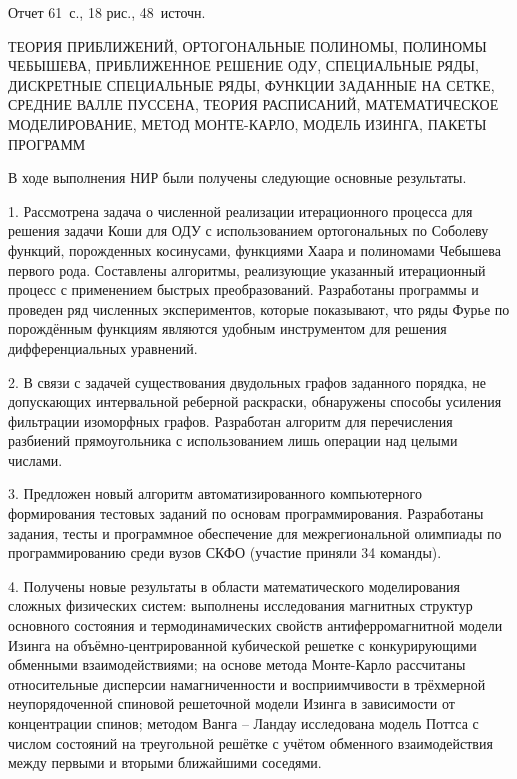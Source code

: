 \Referat %

Отчет 61~с., 18 рис., 48~источн.

 \bigskip
   
   ТЕОРИЯ ПРИБЛИЖЕНИЙ, ОРТОГОНАЛЬНЫЕ ПОЛИНОМЫ, ПОЛИНОМЫ ЧЕБЫШЕВА, %
   ПРИБЛИЖЕННОЕ РЕШЕНИЕ ОДУ, СПЕЦИАЛЬНЫЕ РЯДЫ, ДИСКРЕТНЫЕ СПЕЦИАЛЬНЫЕ РЯДЫ, 
   ФУНКЦИИ ЗАДАННЫЕ НА СЕТКЕ, СРЕДНИЕ ВАЛЛЕ ПУССЕНА, ТЕОРИЯ РАСПИСАНИЙ, 
   МАТЕМАТИЧЕСКОЕ МОДЕЛИРОВАНИЕ, МЕТОД МОНТЕ-КАРЛО, МОДЕЛЬ ИЗИНГА, ПАКЕТЫ ПРОГРАММ

 \bigskip

В ходе выполнения НИР были получены следующие основные результаты.

1. Рассмотрена задача о численной реализации итерационного процесса для решения задачи Коши для ОДУ с использованием ортогональных по Соболеву функций, порожденных косинусами, функциями Хаара и полиномами Чебышева первого рода. Составлены алгоритмы, реализующие указанный итерационный процесс с применением быстрых преобразований. Разработаны программы и проведен ряд численных экспериментов, которые показывают, что ряды Фурье по порождённым функциям являются удобным инструментом для решения дифференциальных уравнений.

2. В связи с задачей существования двудольных графов заданного порядка, не допускающих интервальной реберной раскраски,
обнаружены способы усиления фильтрации изоморфных графов. 
Разработан алгоритм для перечисления разбиений прямоугольника с использованием лишь операции над целыми числами.

3. Предложен новый алгоритм автоматизированного компьютерного формирования тестовых заданий по основам программирования.
Разработаны задания, тесты и программное обеспечение для межрегиональной олимпиады по программированию среди вузов СКФО (участие приняли 34 команды).

4.  Получены новые результаты в области математического моделирования сложных физических систем:
выполнены исследования магнитных структур основного состояния и термодинамических свойств антиферромагнитной модели Изинга на объёмно-центрированной кубической решетке с конкурирующими обменными взаимодействиями;
%
на основе метода Монте-Карло рассчитаны относительные дисперсии намагниченности и восприимчивости в трёхмерной неупорядоченной спиновой решеточной модели Изинга в зависимости от концентрации спинов;
%
методом Ванга – Ландау исследована модель Поттса с числом состояний на треугольной решётке с учётом обменного взаимодействия между первыми и вторыми ближайшими соседями.




